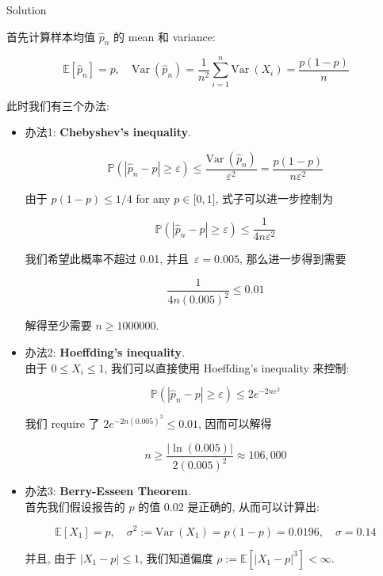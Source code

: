 \documentclass{qlnotes-export}
\begin{document}
\begin{qlsolution}{Solution}

首先计算样本均值 \({\widehat{p}}_{n}\) 的 mean 和 variance:

\[{\mathbb{E}}\left\lbrack {\widehat{p}}_{n} \right\rbrack = p,\quad\text{Var}\ \left( {\widehat{p}}_{n} \right) = \frac{1}{n^{2}}\sum\limits_{i = 1}^{n}\text{Var}\ \left( X_{i} \right) = \frac{p(1 - p)}{n}\]

此时我们有三个办法:

\begin{itemize}
\item
  办法1: \textbf{Chebyshev's inequality}.

  \[{\mathbb{P}}\left( {\left| {{\widehat{p}}_{n} - p} \right| \geq \varepsilon} \right) \leq \frac{\text{Var}\ \left( {\widehat{p}}_{n} \right)}{\varepsilon^{2}} = \frac{p(1 - p)}{n\varepsilon^{2}}\]

  由于 \(p(1 - p) \leq 1/4\) for any \(p \in \lbrack 0,1\rbrack\), 式子可以进一步控制为

  \[{\mathbb{P}}\left( {\left| {{\widehat{p}}_{n} - p} \right| \geq \varepsilon} \right) \leq \frac{1}{4n\varepsilon^{2}}\]

  我们希望此概率不超过 0.01, 并且~\(\varepsilon = 0.005\), 那么进一步得到需要

  \[\frac{1}{4n(0.005)^{2}} \leq 0.01\]

  解得至少需要 \(n \geq 1000000\).
\item
  办法2: \textbf{Hoeffding's inequality}.\\
  由于 \(0 \leq X_{i} \leq 1\), 我们可以直接使用 Hoeffding's inequality 来控制:

  \[{\mathbb{P}}\left( {\left| {{\widehat{p}}_{n} - p} \right| \geq \varepsilon} \right) \leq 2e^{- 2n\varepsilon^{2}}\]

  我们 require 了 \(2e^{- 2n(0.005)^{2}} \leq 0.01\), 因而可以解得

  \[n \geq \frac{|\ln(0.005)|}{2(0.005)^{2}} \approx 106,000\]
\item
  办法3: \textbf{Berry-Esseen Theorem}.\\
  首先我们假设报告的 \(p\) 的值 0.02 是正确的, 从而可以计算出:

  \[{\mathbb{E}}\left\lbrack X_{1} \right\rbrack = p,\quad\sigma^{2} := \text{Var}\ \left( X_{1} \right) = p(1 - p) = 0.0196,\quad\sigma = 0.14\]

  并且, 由于 \(\left| {X_{1} - p} \right| \leq 1\), 我们知道偏度 \(\rho := {\mathbb{E}}\left\lbrack \left| {X_{1} - p} \right|^{3} \right\rbrack < \infty\).


\end{itemize}
\end{qlsolution}
\end{document}
